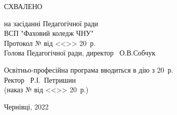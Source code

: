 \begin{titlepage}
\begin{center}
\begin{tabular}{ L{5cm}  C{10cm}}

\end{tabular}
\end{center}



\begin{flushright}
\begin{minipage}{9.5cm}
СХВАЛЕНО

на засіданні Педагогічної ради\\ ВСП "Фаховий коледж ЧНУ"\\
Протокол №\underline{\hspace{0.7cm}} від <<\underline{\hspace{0.7cm}}>> \underline{\hspace{2cm}}  20\underline{\hspace{0.7cm}}~р.\\

Голова Педагогічної ради, директор \underline{\hspace{3cm}}~О.В.Собчук\\
\end{minipage}
\end{flushright}

\begin{flushright}
\begin{minipage}{9.5cm}
Освітньо-професійна програма вводиться в дію з \underline{\hspace{2cm}} 20\underline{\hspace{0.7cm}}~р.\\
Ректор \underline{\hspace{3cm}}~Р.І.~Петришин\\
(наказ №\underline{\hspace{0.7cm}} від <<\underline{\hspace{0.7cm}}>> \underline{\hspace{2cm}}  20\underline{\hspace{0.7cm}}~р.)\\
\end{minipage}
\end{flushright}
\vfill
\begin{center}
Чернівці, 2022
\end{center}
        \end{titlepage}
